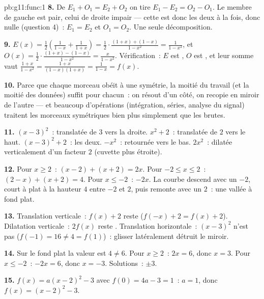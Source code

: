\begin{solution}{pb:g11:func:1}
\textbf{8.} De $E_1 + O_1 = E_2 + O_2$ on tire
$E_1 - E_2 = O_2 - O_1$. Le membre de gauche est pair, celui de
droite impair --- cette  est donc les deux à la fois, donc
nulle (question 4)~: $E_1 = E_2$ et $O_1 = O_2$. Une seule
décomposition.

\textbf{9.} $E(x) = \frac12\left(\frac{1}{1 - x} + \frac{1}{1 +
x}\right) = \frac12 \cdot \frac{(1 + x) + (1 - x)}{1 - x^2}
= \frac{1}{1 - x^2}$, et
$O(x) = \frac12 \cdot \frac{(1 + x) - (1 - x)}{1 - x^2}
= \frac{x}{1 - x^2}$. Vérification~: $E$ est , $O$ est ,
et leur somme vaut $\frac{1 + x}{1 - x^2} =
\frac{1 + x}{(1 - x)(1 + x)} = \frac{1}{1 - x} = f(x)$.

\textbf{10.} Parce que chaque morceau obéit à une symétrie, la
moitié du travail (et la moitié des données) suffit pour chacun~: on
résout d'un côté, on recopie en miroir de l'autre --- et beaucoup
d'opérations (intégration, séries, analyse du signal) traitent les
morceaux symétriques bien plus simplement que les  brutes.

\textbf{11.} $(x-3)^2$~: translatée de $3$ vers la droite.
$x^2 + 2$~: translatée de $2$ vers le haut. $(x-3)^2 + 2$~: les
deux. $-x^2$~: retournée vers le bas. $2x^2$~: dilatée verticalement
d'un facteur $2$ (cuvette plus étroite).

\textbf{12.} Pour $x \geq 2$~: $(x - 2) + (x + 2) = 2x$. Pour
$-2 \leq x \leq 2$~: $(2 - x) + (x + 2) = 4$. Pour $x \leq -2$~:
$-2x$. La courbe descend avec un  $-2$, court à
plat à la hauteur $4$ entre $-2$ et $2$, puis remonte avec un
 $2$~: une vallée à fond plat.

\textbf{13.} Translation verticale~: $f(x) + 2$ reste 
($f(-x) + 2 = f(x) + 2$). Dilatation verticale~: $2f(x)$ reste
. Translation horizontale~: $(x - 3)^2$ n'est pas 
($f(-1) = 16 \neq 4 = f(1)$)~: glisser latéralement détruit le
miroir.

\textbf{14.} Sur le fond plat la valeur est $4 \neq 6$. Pour
$x \geq 2$~: $2x = 6$, donc $x = 3$. Pour $x \leq -2$~: $-2x = 6$,
donc $x = -3$. Solutions~: $\pm 3$.

\textbf{15.} $f(x) = a(x - 2)^2 - 3$ avec $f(0) = 4a - 3 = 1$~:
$a = 1$, donc $f(x) = (x - 2)^2 - 3$.


\end{solution}
